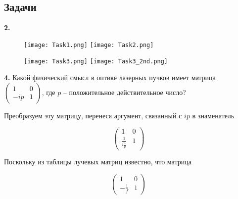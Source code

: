 \documentclass[a4paper,12pt]{article}
\begin{document}
\pagebreak

\subsection*{Задачи}

\textbf{2.} 

\begin{figure}[h!]
    \centering
    \texttt{[image: Task1.png]}
    \texttt{[image: Task2.png]}
    \label{fig2:wit lense}
\end{figure}

\pagebreak

\begin{figure}[h!]
    \centering
    \texttt{[image: Task3.png]}
    \texttt{[image: Task3\_2nd.png]}
    \label{fig2:wit lense}
\end{figure}

\pagebreak



\textbf{4.} Какой физический смысл в оптике лазерных пучков имеет матрица
$\begin{pmatrix}
       1 & 0\\
      -ip & 1
\end{pmatrix}$, где $p$ -- положительное действительное число?

Преобразуем эту матрицу, перенеся аргумент, связанный с $ip$ в знаменатель

\begin{equation*}%
\begin{pmatrix}
       1 & 0\\
       \frac{1}{i\frac{1}{p}} & 1
\end{pmatrix}
\end{equation*}

Поскольку из таблицы лучевых матриц известно, что матрица

\begin{equation*}
\begin{pmatrix}
       1 & 0\\
       -\frac{1}{f} & 1
\end{pmatrix}
\end{equation*}
\end{document}

